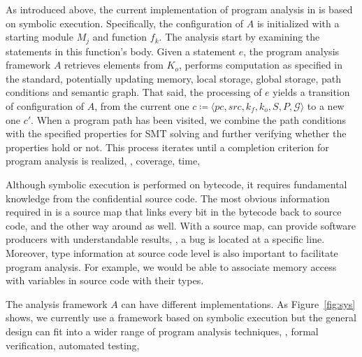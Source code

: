 As introduced above, the current implementation of program analysis in \tcpa is based on 
symbolic execution. Specifically, the configuration of $A$ is initialized with a starting 
module $M_j$ and function $f_k$. The analysis start by examining the statements in this function's body.
Given a statement $e$, the program analysis framework $A$ retrieves elements from $K_o$, performs 
computation as specified in the \wasm standard, potentially updating memory, local storage, 
global storage, path conditions and semantic graph. That said, the processing of $e$ yields a transition 
of configuration of $A$, from the current one $c \coloneqq \langle \mathit{pc}, \mathit{src}, k_f, k_o, S, P, \mathcal{G} \rangle$ 
to a new one $c'$. When a program path has been visited, we combine the path conditions with the specified 
properties for SMT solving and further verifying whether the properties hold or not. This process iterates 
until a completion criterion for program analysis is realized, \eg, coverage, time, \etc

Although symbolic execution is performed on \wasm bytecode, it requires fundamental knowledge from the 
confidential source code. The most obvious information required in \tcpa is a source map that links 
every bit in the bytecode back to source code, and the other way around as well. With a source map, \tcpa 
can provide software producers with understandable results, \eg, a bug is located at a specific line. 
Moreover, type information at source code level is also important to facilitate program analysis. For example, we 
would be able to associate memory access with variables in source code with their types.

The analysis framework $A$ can have different implementations. As Figure~\ref{fig:sys} shows, we currently use 
a framework based on symbolic execution but the general design can fit into a wider range of program analysis techniques, 
\eg, formal verification, automated testing, \etc